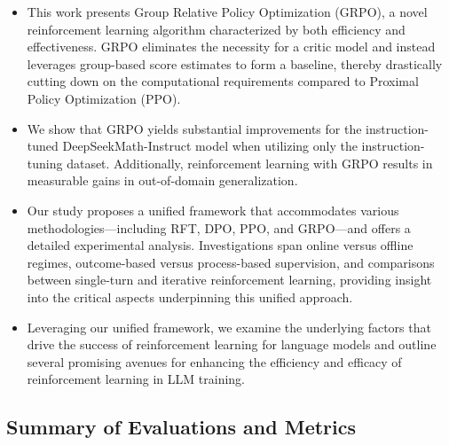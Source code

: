 \begin{itemize}[topsep=0pt]
    \item This work presents Group Relative Policy Optimization (GRPO), a novel reinforcement learning algorithm characterized by both efficiency and effectiveness. GRPO eliminates the necessity for a critic model and instead leverages group-based score estimates to form a baseline, thereby drastically cutting down on the computational requirements compared to Proximal Policy Optimization (PPO).
    \item We show that GRPO yields substantial improvements for the instruction-tuned DeepSeekMath-Instruct model when utilizing only the instruction-tuning dataset. Additionally, reinforcement learning with GRPO results in measurable gains in out-of-domain generalization.
    \item Our study proposes a unified framework that accommodates various methodologies—including RFT, DPO, PPO, and GRPO—and offers a detailed experimental analysis. Investigations span online versus offline regimes, outcome-based versus process-based supervision, and comparisons between single-turn and iterative reinforcement learning, providing insight into the critical aspects underpinning this unified approach.
    \item Leveraging our unified framework, we examine the underlying factors that drive the success of reinforcement learning for language models and outline several promising avenues for enhancing the efficiency and efficacy of reinforcement learning in LLM training.
\end{itemize}

\subsection{Summary of Evaluations and Metrics}

